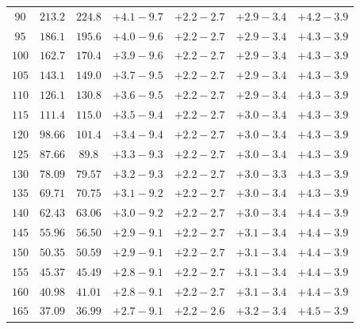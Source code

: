 \begin{table}[p]
\begin{center}
\begin{tabular}{ccccccc}
$ 90 $&$ 213.2  $&$ 224.8 $&$ +4.1  -\!9.7  $&$ +2.2  -\!2.7 $&$ +2.9  -\!3.4 $&$ +4.2  -\!3.9 $\\
$ 95 $&$ 186.1  $&$ 195.6 $&$ +4.0  -\!9.6  $&$ +2.2  -\!2.7 $&$ +2.9  -\!3.4 $&$ +4.3  -\!3.9 $\\
$100 $&$ 162.7  $&$ 170.4 $&$ +3.9  -\!9.6  $&$ +2.2  -\!2.7 $&$ +2.9  -\!3.4 $&$ +4.3  -\!3.9 $\\
$105 $&$ 143.1  $&$ 149.0 $&$ +3.7  -\!9.5  $&$ +2.2  -\!2.7 $&$ +2.9  -\!3.4 $&$ +4.3  -\!3.9 $\\
$110 $&$ 126.1  $&$ 130.8 $&$ +3.6  -\!9.5  $&$ +2.2  -\!2.7 $&$ +2.9  -\!3.4 $&$ +4.3  -\!3.9 $\\
$115 $&$ 111.4  $&$ 115.0 $&$ +3.5  -\!9.4  $&$ +2.2  -\!2.7 $&$ +3.0  -\!3.4 $&$ +4.3  -\!3.9 $\\
$120 $&$  98.66 $&$ 101.4 $&$ +3.4  -\!9.4  $&$ +2.2  -\!2.7 $&$ +3.0  -\!3.4 $&$ +4.3  -\!3.9 $\\
$125 $&$  87.66 $&$  89.8 $&$ +3.3  -\!9.3  $&$ +2.2  -\!2.7 $&$ +3.0  -\!3.4 $&$ +4.3  -\!3.9 $\\
$130 $&$  78.09 $&$ 79.57 $&$ +3.2  -\!9.3  $&$ +2.2  -\!2.7 $&$ +3.0  -\!3.3 $&$ +4.3  -\!3.9 $\\
$135 $&$  69.71 $&$ 70.75 $&$ +3.1  -\!9.2  $&$ +2.2  -\!2.7 $&$ +3.0  -\!3.4 $&$ +4.3  -\!3.9 $\\
$140 $&$  62.43 $&$ 63.06 $&$ +3.0  -\!9.2  $&$ +2.2  -\!2.7 $&$ +3.0  -\!3.4 $&$ +4.4  -\!3.9 $\\
$145 $&$  55.96 $&$ 56.50 $&$ +2.9  -\!9.1  $&$ +2.2  -\!2.7 $&$ +3.1  -\!3.4 $&$ +4.4  -\!3.9 $\\
$150 $&$  50.35 $&$ 50.59 $&$ +2.9  -\!9.1  $&$ +2.2  -\!2.7 $&$ +3.1  -\!3.4 $&$ +4.4  -\!3.9 $\\
$155 $&$  45.37 $&$ 45.49 $&$ +2.8  -\!9.1  $&$ +2.2  -\!2.7 $&$ +3.1  -\!3.4 $&$ +4.4  -\!3.9 $\\
$160 $&$  40.98 $&$ 41.01 $&$ +2.8  -\!9.1  $&$ +2.2  -\!2.7 $&$ +3.1  -\!3.4 $&$ +4.4  -\!3.9 $\\
$165 $&$  37.09 $&$ 36.99 $&$ +2.7  -\!9.1  $&$ +2.2  -\!2.6 $&$ +3.2  -\!3.4 $&$ +4.5  -\!3.9 $\\

\end{tabular}
\end{center}
\end{table}
